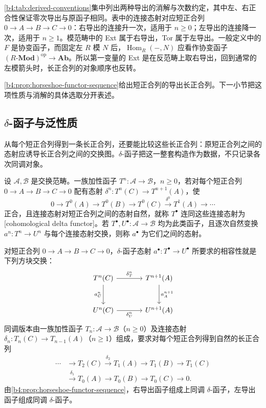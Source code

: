 \cref{b4:tab:derived-conventions}集中列出两种导出的消解与次数约定，其中左、右正合性保证零次导出与原函子相同。表中的连接态射对应短正合列 \(0\to A\to B\to C\to0\)：右导出的连接升一次，适用于 \(n\ge0\)；左导出的连接降一次，适用于 \(n\ge1\)。模范畴中的 Ext 属于右导出，Tor 属于左导出。一般定义中的 \(F\) 是协变函子，而固定左 \(R\) 模 \(N\) 后，\(\operatorname{Hom}_R(-,N)\) 应看作协变函子 \((R\text{-}\mathbf{Mod})^{\mathrm{op}}\to\mathbf{Ab}\)。所以第一变量的 Ext 是在反范畴上取右导出，回到通常的左模箭头时，长正合列的对象顺序也反转。



\cref{b4:prop:horseshoe-functor-sequence}给出短正合列的导出长正合列。下一小节把这项性质与消解的具体选取分开表述。

\subsection{\texorpdfstring{\(\delta\)-函子与泛性质}{\AlgebraPdfDelta-函子与泛性质}}
\label{b4:subsec:0801:02}

从每个短正合列得到一条长正合列，还要能比较这些长正合列：原短正合列之间的态射应诱导长正合列之间的交换图。\(\delta\)-函子把这一整套构造作为数据，不只记录各次同调对象。

\begin{definition}\label{b4:def:delta-functor}
	设 \(\mathcal A,\mathcal B\) 是交换范畴。一族加性函子 \(T^n:\mathcal A\to\mathcal B\)，\(n\ge0\)，若对每个短正合列 \(0\to A\to B\to C\to0\) 配有态射 \(\delta^n:T^n(C)\to T^{n+1}(A)\)，使
	\[
		0\longrightarrow T^0(A)\longrightarrow T^0(B)\longrightarrow T^0(C) \xrightarrow{\delta^0}T^1(A)\longrightarrow\cdots
	\]
	正合，且连接态射对短正合列之间的态射自然，就称 \(T^\bullet\) 连同这些连接态射为[cohomological delta functor]。若 \(T^\bullet,U^\bullet:\mathcal A\to\mathcal B\) 均为此类函子，且逐次自然变换 \(a^n:T^n\to U^n\) 与每个连接态射交换，则称 \(a^\bullet\) 为它们之间的态射。
\end{definition}

对短正合列 \(0\to A\to B\to C\to0\)，\(\delta\)-函子态射 \(a^\bullet:T^\bullet\to U^\bullet\) 所要求的相容性就是下列方块交换：
\[
	\begin{tikzcd}[column sep=large,row sep=large]
		T^n(C)\arrow[r,"\delta_T^n"]\arrow[d,"a_C^n"']&T^{n+1}(A)\arrow[d,"a_A^{n+1}"]\\
		U^n(C)\arrow[r,"\delta_U^n"']&U^{n+1}(A)
	\end{tikzcd}
\]
同调版本由一族加性函子 \(T_n:\mathcal A\to\mathcal B\)（\(n\ge0\)）及连接态射 \(\delta_n:T_n(C)\to T_{n-1}(A)\)（\(n\ge1\)）组成，要求对每个短正合列得到自然的长正合列
\[
	\begin{aligned}
		\cdots&\longrightarrow T_2(C)\xrightarrow{\delta_2}T_1(A) \longrightarrow T_1(B)\longrightarrow T_1(C)\\
		&\xrightarrow{\delta_1}T_0(A)\longrightarrow T_0(B) \longrightarrow T_0(C)\longrightarrow0.
	\end{aligned}
\]
由\cref{b4:prop:horseshoe-functor-sequence}，右导出函子组成上同调 \(\delta\)-函子，左导出函子组成同调 \(\delta\)-函子。

